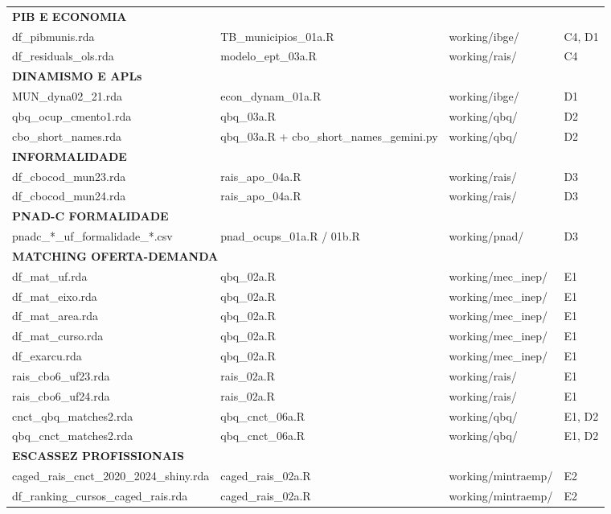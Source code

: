 \documentclass[10pt]{article}
\begin{document}
\begin{longtable}{p{4.5cm}p{5.5cm}p{4.5cm}p{7cm}}
		\multicolumn{4}{l}{\cellcolor{tabC!20}\textbf{PIB E ECONOMIA}} \\
		df\_pibmunis.rda & TB\_municipios\_01a.R & working/ibge/ & C4, D1 \\
		df\_residuals\_ols.rda & modelo\_ept\_03a.R & working/rais/ & C4 \\
		
		\multicolumn{4}{l}{\cellcolor{tabD!20}\textbf{DINAMISMO E APLs}} \\
		MUN\_dyna02\_21.rda & econ\_dynam\_01a.R & working/ibge/ & D1 \\
		qbq\_ocup\_cmento1.rda & qbq\_03a.R & working/qbq/ & D2 \\
		cbo\_short\_names.rda & qbq\_03a.R + cbo\_short\_names\_gemini.py & working/qbq/ & D2 \\
		
		\multicolumn{4}{l}{\cellcolor{tabD!20}\textbf{INFORMALIDADE}} \\
		df\_cbocod\_mun23.rda & rais\_apo\_04a.R & working/rais/ & D3 \\
		df\_cbocod\_mun24.rda & rais\_apo\_04a.R & working/rais/ & D3 \\
		
		\multicolumn{4}{l}{\cellcolor{tabD!20}\textbf{PNAD-C FORMALIDADE}} \\
		pnadc\_*\_uf\_formalidade\_*.csv & pnad\_ocups\_01a.R / 01b.R & working/pnad/ & D3 \\
		
		\multicolumn{4}{l}{\cellcolor{tabE!20}\textbf{MATCHING OFERTA-DEMANDA}} \\
		df\_mat\_uf.rda & qbq\_02a.R & working/mec\_inep/ & E1 \\
		df\_mat\_eixo.rda & qbq\_02a.R & working/mec\_inep/ & E1 \\
		df\_mat\_area.rda & qbq\_02a.R & working/mec\_inep/ & E1 \\
		df\_mat\_curso.rda & qbq\_02a.R & working/mec\_inep/ & E1 \\
		df\_exarcu.rda & qbq\_02a.R & working/mec\_inep/ & E1 \\
		rais\_cbo6\_uf23.rda & rais\_02a.R & working/rais/ & E1 \\
		rais\_cbo6\_uf24.rda & rais\_02a.R & working/rais/ & E1 \\
		cnct\_qbq\_matches2.rda & qbq\_cnct\_06a.R & working/qbq/ & E1, D2 \\
		qbq\_cnct\_matches2.rda & qbq\_cnct\_06a.R & working/qbq/ & E1, D2 \\
		
		\multicolumn{4}{l}{\cellcolor{tabE!20}\textbf{ESCASSEZ PROFISSIONAIS}} \\
		caged\_rais\_cnct\_2020\_2024\_shiny.rda & caged\_rais\_02a.R & working/mintraemp/ & E2 \\
		df\_ranking\_cursos\_caged\_rais.rda & caged\_rais\_02a.R & working/mintraemp/ & E2 \\
		
	\end{longtable}
	
\end{document}
